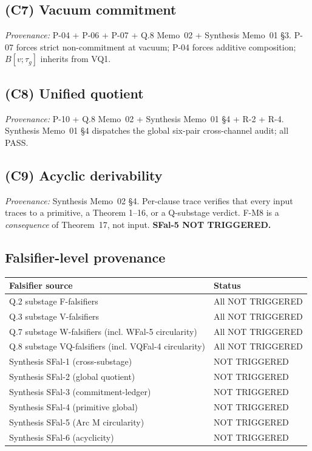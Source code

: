 \documentclass[11pt,a4paper]{article}
\begin{document}
\subsection{(C7) Vacuum commitment} \textit{Provenance:} P-04 + P-06 + P-07 + Q.8 Memo~02 + Synthesis Memo~01 \S3. P-07 forces strict non-commitment at vacuum; P-04 forces additive composition; $B[v;\tau_g]$ inherits from VQ1.

\subsection{(C8) Unified quotient} \textit{Provenance:} P-10 + Q.8 Memo~02 + Synthesis Memo~01 \S4 + R-2 + R-4. Synthesis Memo~01 \S4 dispatches the global six-pair cross-channel audit; all PASS.

\subsection{(C9) Acyclic derivability} \textit{Provenance:} Synthesis Memo~02 \S4. Per-clause trace verifies that every input traces to a primitive, a Theorem 1--16, or a Q-substage verdict. F-M8 is a \emph{consequence} of Theorem~17, not input. \textbf{SFal-5 NOT TRIGGERED.}

\subsection{Falsifier-level provenance}

\begin{center}
\begin{tabular}{ll}
\toprule
\textbf{Falsifier source} & \textbf{Status} \\
\midrule
Q.2 substage F-falsifiers & All NOT TRIGGERED \\
Q.3 substage V-falsifiers & All NOT TRIGGERED \\
Q.7 substage W-falsifiers (incl. WFal-5 circularity) & All NOT TRIGGERED \\
Q.8 substage VQ-falsifiers (incl. VQFal-4 circularity) & All NOT TRIGGERED \\
Synthesis SFal-1 (cross-substage) & NOT TRIGGERED \\
Synthesis SFal-2 (global quotient) & NOT TRIGGERED \\
Synthesis SFal-3 (commitment-ledger) & NOT TRIGGERED \\
Synthesis SFal-4 (primitive global) & NOT TRIGGERED \\
Synthesis SFal-5 (Arc M circularity) & NOT TRIGGERED \\
Synthesis SFal-6 (acyclicity) & NOT TRIGGERED \\
\bottomrule
\end{tabular}
\end{center}
\end{document}
